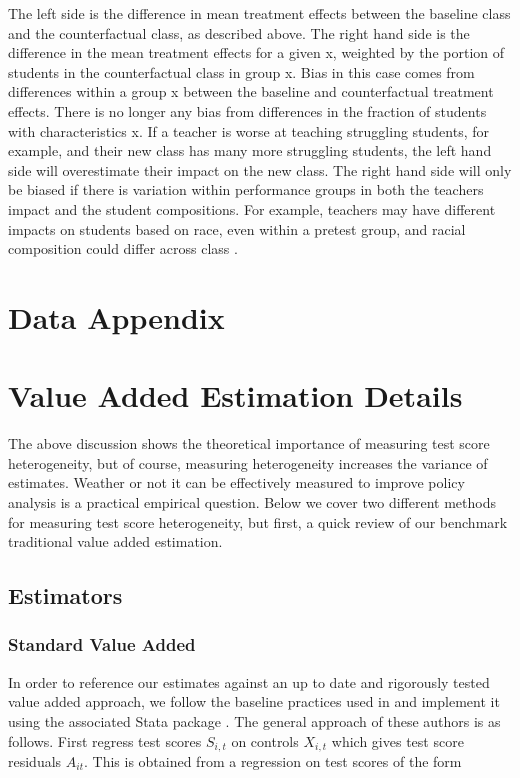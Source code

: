 \documentclass[12pt]{article}
\theoremstyle{definition}
\theoremstyle{definition}
\theoremstyle{definition}
\theoremstyle{definition}
\begin{document}
    The left side is the difference in mean treatment effects between the baseline class and the counterfactual class, as described above. The right hand side is the difference in the mean treatment effects for a given x, weighted by the portion of students in the counterfactual class in group x. Bias in this case comes from differences within a group x between the baseline and counterfactual treatment effects. There is no longer any bias from differences in the fraction of students with characteristics x. If a teacher is worse at teaching struggling students, for example, and their new class has many more struggling students, the left hand side will overestimate their impact on the new class. The right hand side will only be biased if there is variation within performance groups in both the teachers impact and the student compositions. For example, teachers may have different impacts on students based on race, even within a pretest group, and racial composition could differ across class \citep{Delgado2020}.


\section{Data Appendix} \label{data}


\section{Value Added Estimation Details} \label{estimation}


    The above discussion shows the theoretical importance of measuring test score heterogeneity, but of course, measuring heterogeneity increases the variance of estimates. Weather or not it can be effectively measured to improve policy analysis is a practical empirical question. Below we cover two different methods for measuring test score heterogeneity, but first, a quick review of our benchmark traditional value added estimation. 


    \subsection{Estimators}
    \subsubsection{Standard Value Added}

    In order to reference our estimates against an up to date and rigorously tested value added approach, we follow the baseline practices used in \citet{chetty2014measuring1} and implement it using the associated Stata package \citep{vam_stata_ado}. The general approach of these authors is as follows. First regress test scores $S_{i,t}$ on controls $X_{i, t}$ which gives test score residuals $A_{it}$. This is obtained from a regression on test scores of the form 
    
\end{document}
